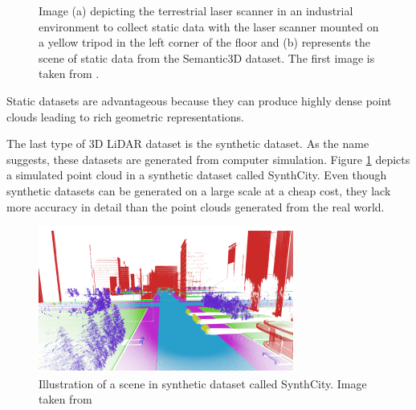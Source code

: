 \begin{figure}[h!]
        \caption{	Image (a) depicting the terrestrial laser scanner in an industrial environment to collect static data with the laser scanner mounted on a yellow tripod in the left corner of the floor and 
        (b) represents the scene of static data from the Semantic3D dataset. The first image is taken from \cite{tls}.}
       
    \end{figure}
    Static datasets are advantageous because they can produce highly dense point clouds leading to rich geometric representations.
    
    The last type of 3D LiDAR dataset is the synthetic dataset. 
    As the name suggests, these datasets are generated from computer simulation. 
    Figure \ref{fig:synthetic} depicts a simulated point cloud in a synthetic dataset called SynthCity.
    Even though synthetic datasets can be generated on a large scale at a cheap cost, they lack more accuracy in detail than the point clouds generated from the real world.
    \begin{figure}[h!]
        \centering
        \includegraphics[scale=0.5]{images/synthcity.png}
        \caption{Illustration of a scene in synthetic dataset called SynthCity. Image taken from \cite{griffiths2019synthcity}}
        \label{fig:synthetic}
    \end{figure}
    
